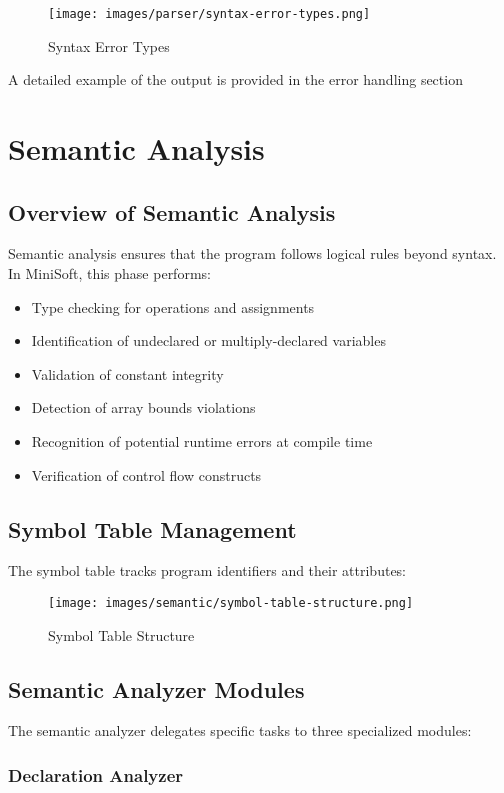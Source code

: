 \documentclass[12pt,a4paper]{article}
\begin{document}
\begin{figure}[H]
	\centering
	\texttt{[image: images/parser/syntax-error-types.png]}
	\caption{Syntax Error Types}
\end{figure}

A detailed example of the output is provided in the error handling section

\section{Semantic Analysis}
\subsection{Overview of Semantic Analysis}
Semantic analysis ensures that the program follows logical rules beyond syntax. In MiniSoft, this phase performs:

\begin{itemize}
	\item Type checking for operations and assignments
	\item Identification of undeclared or multiply-declared variables
	\item Validation of constant integrity
	\item Detection of array bounds violations
	\item Recognition of potential runtime errors at compile time
	\item Verification of control flow constructs
\end{itemize}

\subsection{Symbol Table Management}
The symbol table tracks program identifiers and their attributes:


\begin{figure}[H]
	\centering
	\texttt{[image: images/semantic/symbol-table-structure.png]}
	\caption{Symbol Table Structure}
\end{figure}

\subsection{Semantic Analyzer Modules}

The semantic analyzer delegates specific tasks to three specialized modules:

\subsubsection{Declaration Analyzer}
\end{document}
